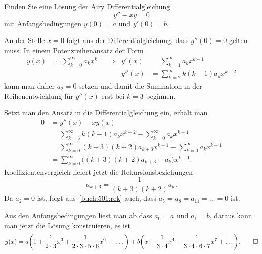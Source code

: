 Finden Sie eine Lösung der Airy Differentialgleichung
%
\[
y''-xy=0
\]
mit Anfangsbedingungen $y(0)=a$ und $y'(0)=b$.

\begin{loesung}
An der Stelle $x=0$ folgt aus der Differentialgleichung, dass $y''(0)=0$
gelten muss.
In einem Potenzreihenansatz der Form
\begin{align*}
y(x)
&=
\sum_{k=0}^\infty a_kx^k
&&\Rightarrow&
y'(x)
&=
\sum_{k=1}^\infty a_kx^{k-1}
\\
&&&&
y''(x)
&=
\sum_{k=2}^\infty k(k-1)a_kx^{k-2}
\end{align*}
kann man daher $a_2=0$ setzen und damit die Summation in der
Reihenentwicklung für $y''(x)$ erst bei $k=3$ beginnen.

Setzt man den Ansatz in die Differentialgleichung ein, erhält man
\begin{align*}
0
&=
y''(x)-xy(x)
\\
&=
\sum_{k=3}^\infty k(k-1)a_kx^{k-2}
-
\sum_{k=0}^\infty a_kx^{k+1}
\\
&=
\sum_{k=0}^\infty (k+3)(k+2)a_{k+3}x^{k+1}
-
\sum_{k=0}^\infty a_{k}x^{k+1}
\\
&=
\sum_{k=0}^\infty \bigl((k+3)(k+2)a_{k+3}-a_{k}\bigr)x^{k+1}.
\end{align*}
Koeffizientenvergleich liefert jetzt die Rekursionsbeziehungen
\begin{equation}
a_{k+3} = \frac1{(k+3)(k+2)} {a_k}.
\label{buch:501:rek}
\end{equation}
Da $a_2=0$ ist, folgt aus~\eqref{buch:501:rek}
auch, dass $a_5=a_8=a_{11}=\dots=0$ ist.

Aus den Anfangsbedingungen liest man ab dass $a_0=a$ und $a_1=b$, daraus
kann man jetzt die Lösung konstruieren, es ist
\[
y(x)
=
a\biggl(1+\frac{1}{2\cdot 3}x^3 + \frac{1}{2\cdot3\cdot5\cdot 6}x^6 + \dots\biggr)
+
b\biggl(x+\frac{1}{3\cdot 4}x^4 + \frac{1}{3\cdot 4\cdot 6\cdot 7}x^7+\dots\biggr).
\qedhere
\]
\end{loesung}
